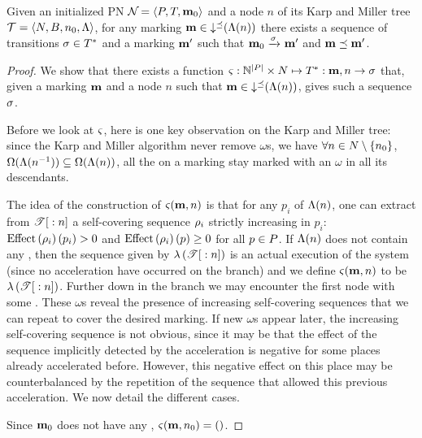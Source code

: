 \begin{lemm}
  \label{theo:km-correctness}
  Given an initialized \ac{PN} $\defPN$ and a node $n$ of its Karp and Miller tree $\mathcal{T} = \left\langle N, B, n_0, \operatorname{\Lambda}\right\rangle$,
  for any marking $\mathbf{m} \in \operatorname{\downarrow^\preceq}(\operatorname{\Lambda}(n))$ there exists a sequence of transitions $\seqt \in \transitions^*$ and a marking $\mathbf{m}'$ such that $\mari \fire{\seqt} \mar'$ and $\mathbf{m} \preceq \mathbf{m}'$.
\end{lemm}

\begin{proof}
  We show that there exists a function $\Tts : \naturals^{\card{\places}} \times \nodes \mapsto \transitions^* : \mar, n \rightarrow \seqt$ that, given a marking $\mathbf{m}$ and a node $n$ such that $\mathbf{m} \in \operatorname{\downarrow^\preceq}(\operatorname{\Lambda}(n))$, gives such a sequence $\seqt$.

  Before we look at $\operatorname{\varsigma}$, here is one key observation on the Karp and Miller tree:
  since the Karp and Miller algorithm never remove $\omega$s, we have
  $\forall n \in N \setminus \{n_0\}$, $\operatorname{\Omega}(\operatorname{\Lambda}(n^{-1})) \subseteq \operatorname{\Omega}(\operatorname{\Lambda}(n))$,
  \ie all the \oplaces on a marking stay marked with an $\omega$ in all its descendants.

  The idea of the construction of $\operatorname{\varsigma}(\mathbf{m},n)$ is that for any \oplace $p_i$ of $\operatorname{\Lambda}(n)$, one can extract from ${\mathscr{T}}[{}:{n}]$ a self-covering sequence $\iscs{i}$ strictly increasing in $p_i$:
  $\effect{\iscs{i}}(p_i) > 0$ and $\effect{\iscs{i}}(p) \geq 0$ for all $p \in P$.
  If $\operatorname{\Lambda}(n)$ does not contain any \oplace, then the sequence given by $\operatorname{\lambda}\left({{\mathscr{T}}[{}:{n}]}\right)$ is an actual execution of the system (since no acceleration have occurred on the branch) and we define $\operatorname{\varsigma}(\mathbf{m},n)$ to be $\operatorname{\lambda}\left({{\mathscr{T}}[{}:{n}]}\right)$.
  Further down in the branch we may encounter the first node with some \oplaces.
  These $\omega$s reveal the presence of increasing self-covering sequences that we can repeat to cover the desired marking.
  If new $\omega$s appear later, the  increasing self-covering sequence is not obvious, since it may be that the effect of the sequence implicitly detected by the acceleration is negative for some places already accelerated before.
  However, this negative effect on this place may be counterbalanced by the repetition of the sequence that allowed this previous acceleration.
  We now detail the different cases.

  Since $\mathbf{m}_0$ does not have any \oplace, $\operatorname{\varsigma}(\mathbf{m},n_0) = ()$.


\end{proof}
